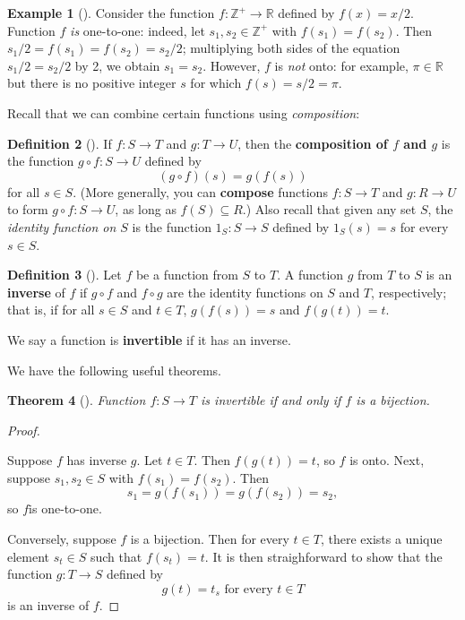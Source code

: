 \documentclass[10pt,openany,oneside]{book}
\newcommand{\terminology}[1]{\textbf{#1}}
\theoremstyle{plain}
\newtheorem{theorem}{Theorem}[section]
\theoremstyle{definition}
\newtheorem{definition}[theorem]{Definition}
\theoremstyle{definition}
\theoremstyle{definition}
\newtheorem{example}[theorem]{Example}
\theoremstyle{definition}
\numberwithin{equation}{section}
\def\Z{\mathbb{Z}}
\def\R{\mathbb{R}}
\begin{document}
\begin{example}[]\label{example-7}
Consider the function \(f: \Z^+ \to \R\) defined by \(f(x)=x/2\). Function \(f\) \emph{is} one-to-one: indeed, let \(s_1, s_2 \in \Z^+\) with \(f(s_1)=f(s_2)\). Then \(s_1/2=f(s_1)=f(s_2)=s_2/2\); multiplying both sides of the equation \(s_1/2=s_2/2\) by 2, we obtain \(s_1=s_2\). However, \(f\) is \emph{not} onto: for example, \(\pi\in \R\) but there is no positive integer \(s\) for which \(f(s)=s/2=\pi\).%
\end{example}
Recall that we can combine certain functions using \emph{composition}:%
\begin{definition}[{}]\label{definition-10}
\label{notation-26}
\label{notation-27}
If \(f:S\to T\) and \(g:T\to U\), then the  \terminology{composition of \(f\) and \(g\)} is the function \(g\circ f: S\to U\) defined by%
\begin{equation*}
(g\circ f)(s)=g(f(s))
\end{equation*}
for all \(s\in S\). (More generally, you can \terminology{compose} functions \(f:S\to T\) and \(g:R\to U\) to form \(g\circ f:S\to U\),  as long as \(f(S)\subseteq R\).) Also recall that given any set \(S\), the \emph{identity function on \(S\)} is the function \(1_S: S\to S\) defined by \(1_S(s)=s\) for every \(s\in S\).%
\end{definition}
\begin{definition}[{}]\label{definition-11}
Let \(f\) be a function from \(S\) to \(T\). A function \(g\) from \(T\) to \(S\) is an \terminology{inverse} of \(f\) if \(g\circ f\) and \(f\circ g\) are the identity functions on \(S\) and \(T\), respectively; that is, if for all \(s\in S\) and \(t\in
T\), \(g(f(s))=s\) and \(f(g(t))=t\).%
\par
We say a function is \terminology{invertible} if it has an inverse.%
\end{definition}
We have the following useful theorems.%
\begin{theorem}[{}]\label{invbij}
Function \(f:S\to T\) is invertible if and only if \(f\) is a bijection.%
\end{theorem}
\begin{proof}\hypertarget{proof-1}{}
Suppose \(f\) has inverse \(g\). Let \(t\in T\). Then \(f(g(t))=t\), so \(f\) is onto.  Next, suppose \(s_1,s_2\in S\) with \(f(s_1)=f(s_2)\). Then%
\begin{equation*}
s_1=g(f(s_1))=g(f(s_2))=s_2,
\end{equation*}
so \(f\)is one-to-one.%
\par
Conversely, suppose \(f\) is a bijection.  Then for every \(t\in T\), there exists a unique element \(s_t\in S\) such that \(f(s_t)=t\). It is then straighforward to show that the function \(g:T\to S\) defined by%
\begin{equation*}
g(t)=t_s \text{ for every }t\in T
\end{equation*}
is an inverse of \(f\).%
\end{proof}
\end{document}
